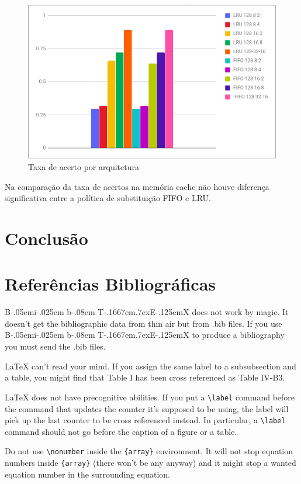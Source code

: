 \documentclass[conference]{IEEEtran}
\def\BibTeX{{\rm B\kern-.05em{\sc i\kern-.025em b}\kern-.08em
    T\kern-.1667em\lower.7ex\hbox{E}\kern-.125emX}}
\begin{document}
\begin{figure}
    \centering
    \includegraphics[width=\linewidth]{Imagens/HIT_RATE_POR_ARQUITETURA.png}
    \caption{Taxa de acerto por arquitetura}
    \label{fig:Taxa de acerto por arquitetura}
\end{figure}

Na comparação da taxa de acertos na memória cache não houve diferença significativa entre a política de substituição FIFO e LRU.

\section{Conclusão}

\section{Referências Bibliográficas}




{\BibTeX} does not work by magic. It doesn't get the bibliographic
data from thin air but from .bib files. If you use {\BibTeX} to produce a
bibliography you must send the .bib files. 

{\LaTeX} can't read your mind. If you assign the same label to a
subsubsection and a table, you might find that Table I has been cross
referenced as Table IV-B3. 

{\LaTeX} does not have precognitive abilities. If you put a
\verb|\label| command before the command that updates the counter it's
supposed to be using, the label will pick up the last counter to be
cross referenced instead. In particular, a \verb|\label| command
should not go before the caption of a figure or a table.

Do not use \verb|\nonumber| inside the \verb|{array}| environment. It
will not stop equation numbers inside \verb|{array}| (there won't be
any anyway) and it might stop a wanted equation number in the
surrounding equation.
\end{document}
